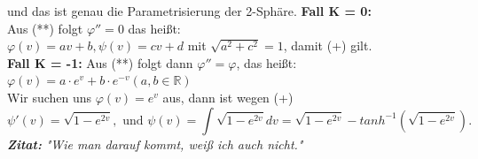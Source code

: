 \begin{problem*}[2b]
\begin{equation*}
\end{equation*}
und das ist genau die Parametrisierung der 2-Sphäre.
\textbf{Fall K = 0:}\\
Aus (**) folgt $ \varphi'' = 0 $ das heißt: \\
$\varphi(v) = av + b, \psi(v) = cv + d$ mit $\sqrt{ a^2 + c^2 } = 1$, damit (+) gilt.\\
\textbf{Fall K = -1: } Aus (**) folgt dann $\varphi'' = \varphi$, das heißt:\\
$\varphi(v) = a \cdot e^v + b \cdot e^{ -v } (a,b \in \mathbb{R})$ \\
Wir suchen uns $\varphi(v) = e^v$ aus, dann ist wegen (+)
\begin{equation*}
 	 \psi'(v) = \sqrt{ 1- e^{ 2v } }, \text{ und } \psi(v) = \int{ \sqrt{ 1 - e^{ 2v } } }dv = \sqrt{ 1 - e^{ 2v } } -tanh^{ -1 }(\sqrt{ 1- e^{ 2v } }).
 \end{equation*}
 \emph{\textbf{Zitat:}} \emph{"Wie man darauf kommt, weiß ich auch nicht."}
\end{problem*}


